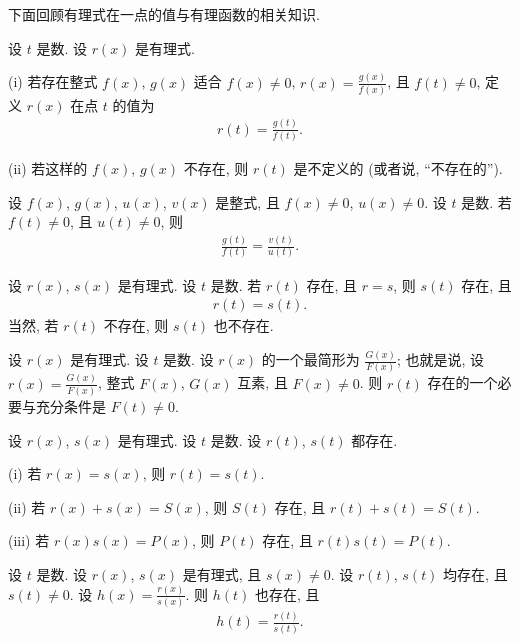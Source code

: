 下面回顾有理式在一点的值与有理函数的相关知识.

\begin{definition}
    设 $t$ 是数. 设 $r(x)$ 是有理式.

    (i) 若存在整式 $f(x)$, $g(x)$ 适合 $f(x) \neq 0$, $r(x) = \frac{g(x)}{f(x)}$, 且 $f(t) \neq 0$, 定义 $r(x)$ 在点 $t$ 的值为
    \begin{align*}
        r(t) = \frac{g(t)}{f(t)}.
    \end{align*}

    (ii) 若这样的 $f(x)$, $g(x)$ 不存在, 则 $r(t)$ 是不定义的 (或者说, ``不存在的'').
\end{definition}

\begin{proposition}
    设 $f(x)$, $g(x)$, $u(x)$, $v(x)$ 是整式, 且 $f(x) \neq 0$, $u(x) \neq 0$. 设 $t$ 是数. 若 $f(t) \neq 0$, 且 $u(t) \neq 0$, 则
    \begin{align*}
        \frac{g(t)}{f(t)} = \frac{v(t)}{u(t)}.
    \end{align*}
\end{proposition}

\begin{proposition}
    设 $r(x)$, $s(x)$ 是有理式. 设 $t$ 是数. 若 $r(t)$ 存在, 且 $r = s$, 则 $s(t)$ 存在, 且
    \begin{align*}
        r(t) = s(t).
    \end{align*}
    当然, 若 $r(t)$ 不存在, 则 $s(t)$ 也不存在.
\end{proposition}

\begin{proposition}
    设 $r(x)$ 是有理式. 设 $t$ 是数. 设 $r(x)$ 的一个最简形为 $\frac{G(x)}{F(x)}$; 也就是说, 设 $r(x) = \frac{G(x)}{F(x)}$, 整式 $F(x)$, $G(x)$ 互素, 且 $F(x) \neq 0$. 则 $r(t)$ 存在的一个必要与充分条件是 $F(t) \neq 0$.
\end{proposition}

\begin{proposition}
    设 $r(x)$, $s(x)$ 是有理式. 设 $t$ 是数. 设 $r(t)$, $s(t)$ 都存在.

    (i) 若 $r(x) = s(x)$, 则 $r(t) = s(t)$.

    (ii) 若 $r(x) + s(x) = S(x)$, 则 $S(t)$ 存在, 且 $r(t) + s(t) = S(t)$.

    (iii) 若 $r(x) s(x) = P(x)$, 则 $P(t)$ 存在, 且 $r(t) s(t) = P(t)$.
\end{proposition}

\begin{proposition}
    设 $t$ 是数. 设 $r(x)$, $s(x)$ 是有理式, 且 $s(x) \neq 0$. 设 $r(t)$, $s(t)$ 均存在, 且 $s(t) \neq 0$. 设 $h(x) = \frac{r(x)}{s(x)}$. 则 $h(t)$ 也存在, 且
    \begin{align*}
        h(t) = \frac{r(t)}{s(t)}.
    \end{align*}
\end{proposition}

